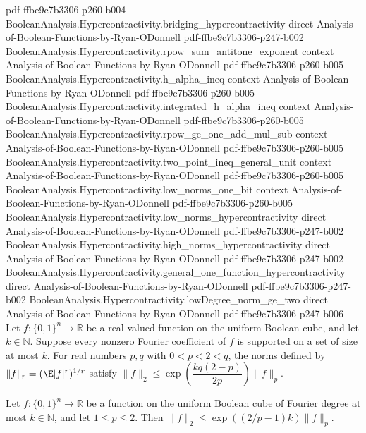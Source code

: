 \begin{lemma}
  {pdf-ffbe9c7b3306-p260-b004}
\proofstep
  {BooleanAnalysis.Hypercontractivity.bridging_hypercontractivity}
  {direct}
  {Analysis-of-Boolean-Functions-by-Ryan-ODonnell}
  {pdf-ffbe9c7b3306-p247-b002}
\proofstep
  {BooleanAnalysis.Hypercontractivity.rpow_sum_antitone_exponent}
  {context}
  {Analysis-of-Boolean-Functions-by-Ryan-ODonnell}
  {pdf-ffbe9c7b3306-p260-b005}
\proofstep
  {BooleanAnalysis.Hypercontractivity.h_alpha_ineq}
  {context}
  {Analysis-of-Boolean-Functions-by-Ryan-ODonnell}
  {pdf-ffbe9c7b3306-p260-b005}
\proofstep
  {BooleanAnalysis.Hypercontractivity.integrated_h_alpha_ineq}
  {context}
  {Analysis-of-Boolean-Functions-by-Ryan-ODonnell}
  {pdf-ffbe9c7b3306-p260-b005}
\proofstep
  {BooleanAnalysis.Hypercontractivity.rpow_ge_one_add_mul_sub}
  {context}
  {Analysis-of-Boolean-Functions-by-Ryan-ODonnell}
  {pdf-ffbe9c7b3306-p260-b005}
\proofstep
  {BooleanAnalysis.Hypercontractivity.two_point_ineq_general_unit}
  {context}
  {Analysis-of-Boolean-Functions-by-Ryan-ODonnell}
  {pdf-ffbe9c7b3306-p260-b005}
\proofstep
  {BooleanAnalysis.Hypercontractivity.low_norms_one_bit}
  {context}
  {Analysis-of-Boolean-Functions-by-Ryan-ODonnell}
  {pdf-ffbe9c7b3306-p260-b005}
\proofstep
  {BooleanAnalysis.Hypercontractivity.low_norms_hypercontractivity}
  {direct}
  {Analysis-of-Boolean-Functions-by-Ryan-ODonnell}
  {pdf-ffbe9c7b3306-p247-b002}
\proofstep
  {BooleanAnalysis.Hypercontractivity.high_norms_hypercontractivity}
  {direct}
  {Analysis-of-Boolean-Functions-by-Ryan-ODonnell}
  {pdf-ffbe9c7b3306-p247-b002}
\proofstep
  {BooleanAnalysis.Hypercontractivity.general_one_function_hypercontractivity}
  {direct}
  {Analysis-of-Boolean-Functions-by-Ryan-ODonnell}
  {pdf-ffbe9c7b3306-p247-b002}
\proofstep
  {BooleanAnalysis.Hypercontractivity.lowDegree_norm_ge_two}
  {direct}
  {Analysis-of-Boolean-Functions-by-Ryan-ODonnell}
  {pdf-ffbe9c7b3306-p247-b006}
Let $f:\{0,1\}^n\to\mathbb R$ be a real-valued function on the uniform Boolean cube, and
let $k\in\mathbb N$. Suppose every nonzero Fourier coefficient of $f$ is supported on a
set of size at most $k$. For real numbers $p,q$ with $0<p<2<q$, the norms defined by
$\|f\|_r=(\E|f|^r)^{1/r}$ satisfy $\|f\|_2\le
\exp\!\left(\dfrac{kq(2-p)}{2p}\right)\|f\|_p$.
\end{lemma}

\begin{theorem}
\leanok
{}
Let $f:\{0,1\}^n\to\mathbb R$ be a function on the uniform Boolean cube of Fourier degree at most $k\in\mathbb N$, and let $1\le p\le2$. Then $\|f\|_2\le\exp((2/p-1)k)\|f\|_p$.
\end{theorem}

